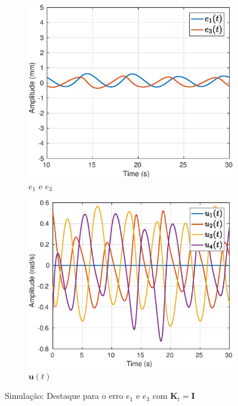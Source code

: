 \begin{figure}[H]
\centering
\begin{subfigure}{.5\textwidth}
  \centering
  \includegraphics[width=\linewidth]{./img/simul_delay_zoh1/error.eps}
  \caption{$e_1$ e $e_3$}
  \label{fig:sub1}
\end{subfigure}%
\begin{subfigure}{.5\textwidth}
  \centering
  \includegraphics[width=\linewidth]{./img/simul_delay_zoh1/u.eps}
  \caption{$\bm{u}(t)$}
  \label{fig:sub2}
\end{subfigure}
\caption{Simulação: Destaque para o erro $e_1$ e $e_3$ com $\bm{K}_t = \bm{I}$}
\label{fig:erro_traj}
\end{figure}


